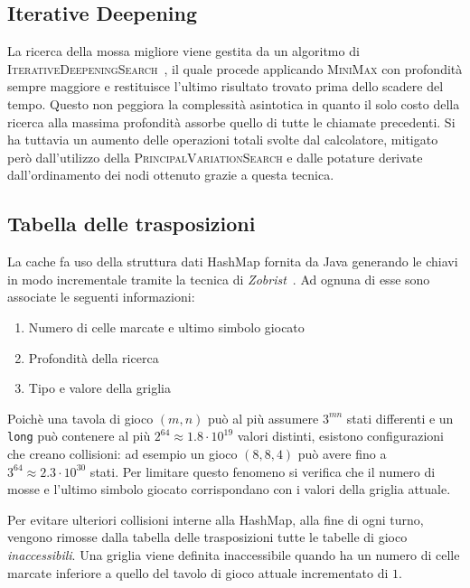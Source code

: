 \documentclass{article}
\begin{document}
\subsection*{Iterative Deepening}

La ricerca della mossa migliore viene gestita da un algoritmo di
\textsc{IterativeDeepeningSearch}~\cite{id}, il quale procede applicando \textsc{MiniMax} 
con profondit\`a sempre maggiore e restituisce l'ultimo risultato trovato prima dello
scadere del tempo. Questo non peggiora la complessit\`a asintotica in quanto il
solo costo della ricerca alla massima profondit\`a assorbe quello di tutte
le chiamate precedenti. Si ha tuttavia un aumento delle operazioni totali svolte
dal calcolatore, mitigato per\`o dall'utilizzo della \textsc{PrincipalVariationSearch} 
e dalle potature derivate dall'ordinamento dei nodi ottenuto grazie a questa tecnica.

\subsection*{Tabella delle trasposizioni}

La cache fa uso della struttura dati HashMap fornita da Java generando le chiavi 
in modo incrementale tramite la tecnica di \emph{Zobrist}~\cite{zobrist}. 
Ad ognuna di esse sono associate le seguenti informazioni:
\begin{enumerate}
  \item Numero di celle marcate e ultimo simbolo giocato
  \item Profondit\`a della ricerca
  \item Tipo e valore della griglia
\end{enumerate}
Poich\`e una tavola di gioco $(m,n)$ pu\`o al pi\`u assumere $3^{mn}$ stati differenti e
un \verb!long! pu\`o contenere al pi\`u $2^{64} \approx 1.8 \cdot 10^{19}$ valori distinti,
esistono configurazioni che creano collisioni: ad esempio un gioco $(8, 8, 4)$
pu\`o avere fino a $3^{64} \approx 2.3 \cdot 10^{30}$ stati. Per limitare questo
fenomeno si verifica che il numero di mosse e l'ultimo simbolo giocato
corrispondano con i valori della griglia attuale.

Per evitare ulteriori collisioni interne alla HashMap, alla fine di ogni turno,
vengono rimosse dalla tabella delle trasposizioni tutte le tabelle di gioco
\emph{inaccessibili}. Una griglia viene definita inaccessibile quando ha un numero di
celle marcate inferiore a quello del tavolo di gioco attuale incrementato di $1$.
\end{document}
